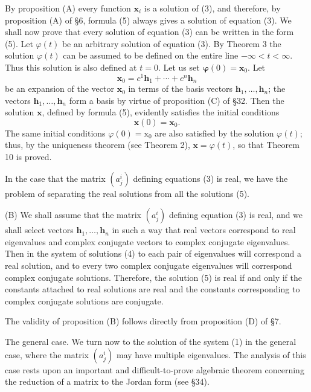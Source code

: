 \documentclass[10pt,a5paper]{book}
\makeatletter
\theoremstyle{plain}
\theoremstyle{definition}
\theoremstyle{remark}
\renewenvironment{proof}[1][\proofname]{\par
  \pushQED{\qed}%
  \normalfont\topsep6\p@\@plus6\p@\relax
  \trivlist
  \item\relax{\itshape #1\@addpunct{.}}\hspace\labelsep\ignorespaces
}{\popQED\endtrivlist\@endpefalse}
\makeatother
\begin{document}
\begin{proof}
By proposition (A) every function $\mathbf{x}_{i}$ is a solution of (3), and therefore, by proposition (A) of §6, formula (5) always gives a solution of equation (3). We shall now prove that every solution of equation (3) can be written in the form (5). Let $\varphi(t)$ be an arbitrary solution of equation (3). By Theorem 3 the solution $\varphi(t)$ can be assumed to be defined on the entire line $-\infty<t<\infty$. Thus this solution is also defined at $t=0$. Let us set $\boldsymbol{\varphi}(0)=\mathbf{x}_{0}$. Let
\[
\mathbf{x}_{0}=c^{1} \mathbf{h}_{1}+\cdots+c^{n} \mathbf{h}_{n}
\]
be an expansion of the vector $\mathbf{x}_{0}$ in terms of the basis vectors $\mathbf{h}_{1}, \ldots, \mathbf{h}_{n}$; the vectors $\mathbf{h}_{1}, \ldots, \mathbf{h}_{n}$ form a basis by virtue of proposition (C) of §32. Then the solution $\mathbf{x}$, defined by formula (5), evidently satisfies the initial conditions
\[
\mathbf{x}(0)=\mathbf{x}_{0} .
\]
The same initial conditions $\varphi(0)=\mathrm{x}_{0}$ are also satisfied by the solution $\varphi(t)$; thus, by the uniqueness theorem (see Theorem 2), $\mathbf{x}=\varphi(t)$, so that Theorem 10 is proved.
\end{proof}

In the case that the matrix $\left(a_{j}^{i}\right)$ defining equations (3) is real, we have the problem of separating the real solutions from all the solutions (5).

(B) We shall assume that the matrix $\left(a_{j}^{i}\right)$ defining equation (3) is real, and we shall select vectors $\mathbf{h}_{1}, \ldots, \mathbf{h}_{n}$ in such a way that real vectors correspond to real eigenvalues and complex conjugate vectors to complex conjugate eigenvalues. Then in the system of solutions (4) to each pair of eigenvalues will correspond a real solution, and to every two complex conjugate eigenvalues will correspond complex conjugate solutions. Therefore, the solution (5) is real if and only if the constants attached to real solutions are real and the constants corresponding to complex conjugate solutions are conjugate.

The validity of proposition (B) follows directly from proposition (D) of §7.

The general case. We turn now to the solution of the system (1) in the general case, where the matrix $\left(a_{j}^{i}\right)$ may have multiple eigenvalues. The analysis of this case rests upon an important and difficult-to-prove algebraic theorem concerning the reduction of a matrix to the Jordan form (see §34).
\end{document}
